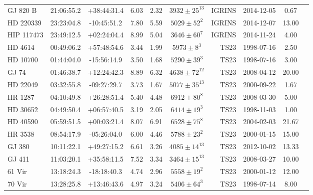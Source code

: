 \begin{scriptsize}
\begin{longtable}{lcccccrccc}
    GJ 820 B &   21:06:55.2 &   +38:44:31.4 &   6.03 &  2.32 &    $3932 \pm 25^{13}$ &      IGRINS &      2014-12-05 &              0.67  \\
  HD 220339 &   23:23:04.8 &   -10:45:51.2 &   7.80 &  5.59 &     $5029 \pm 52^{2}$ &      IGRINS &      2014-12-07 &             13.00  \\
 HIP 117473 &   23:49:12.5 &   +02:24:04.4 &   8.99 &  5.04 &     $3646 \pm 60^{7}$ &      IGRINS &      2014-11-24 &              4.00  \\
    HD 4614 &   00:49:06.2 &   +57:48:54.6 &   3.44 &  1.99 &      $5973 \pm 8^{3}$ &        TS23 &      1998-07-16 &              2.50  \\
    HD 10700 &   01:44:04.0 &   -15:56:14.9 &   3.50 &  1.68 &     $5290 \pm 39^{3}$ &        TS23 &      1998-07-16 &              3.00  \\
      GJ 74 &   01:46:38.7 &   +12:24:42.3 &   8.89 &  6.32 &    $4638 \pm 72^{12}$ &        TS23 &      2008-04-12 &             20.00  \\
    HD 22049 &   03:32:55.8 &   -09:27:29.7 &   3.73 &  1.67 &    $5077 \pm 35^{13}$ &        TS23 &      2000-09-22 &              1.67  \\
    HR 1287 &   04:10:49.8 &   +26:28:51.4 &   5.40 &  4.48 &     $6912 \pm 80^{8}$ &        TS23 &      2008-03-30 &              5.00  \\
    HD 30652 &   04:49:50.4 &   +06:57:40.5 &   3.19 &  2.05 &     $6414 \pm 19^{3}$ &        TS23 &      1998-11-03 &              1.00  \\
   HD 40590 &   05:59:51.5 &   +00:03:21.4 &   8.07 &  6.91 &     $6528 \pm 75^{8}$ &        TS23 &      2004-02-03 &             21.67  \\
    HR 3538 &   08:54:17.9 &   -05:26:04.0 &   6.00 &  4.46 &     $5788 \pm 23^{2}$ &        TS23 &      2000-01-15 &             15.00  \\
     GJ 380 &   10:11:22.1 &   +49:27:15.2 &   6.61 &  3.26 &    $4085 \pm 14^{13}$ &        TS23 &      2012-10-02 &             13.33  \\
     GJ 411 &   11:03:20.1 &   +35:58:11.5 &   7.52 &  3.34 &    $3464 \pm 15^{13}$ &        TS23 &      2008-03-27 &             10.00  \\
     61 Vir &   13:18:24.3 &   -18:18:40.3 &   4.74 &  2.96 &     $5558 \pm 19^{2}$ &        TS23 &      2000-01-12 &             12.00  \\
     70 Vir &   13:28:25.8 &   +13:46:43.6 &   4.97 &  3.24 &     $5406 \pm 64^{3}$ &        TS23 &      1998-07-14 &              8.00  \\

\end{longtable}
\end{scriptsize}
